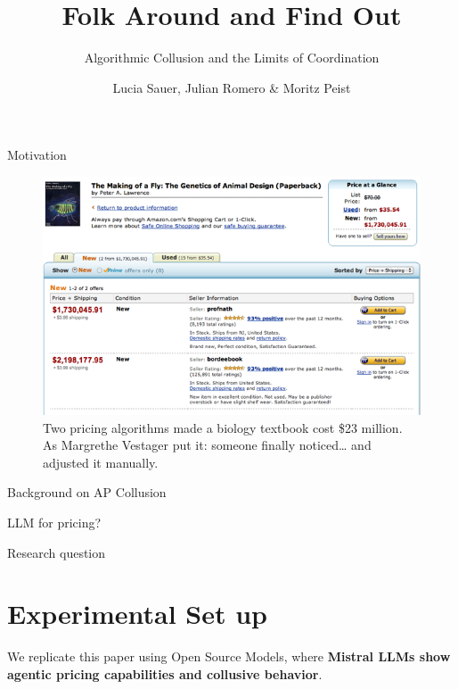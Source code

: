 \documentclass[10pt, aspectratio=169]{beamer}
\title{Folk Around and Find Out}
\subtitle{Algorithmic Collusion and the Limits of Coordination}
\date{}
\author{Lucia Sauer, Julian Romero \& Moritz Peist }
\institute{Barcelona School of Economics}
\begin{document}
\maketitle

\begin{frame}{Motivation}
\begin{figure}
        \centering
        \includegraphics[width=0.7\linewidth]{latex/slides_pricing_collusion/imgs/the_making_of_a_fly.png}
        \caption{Two pricing algorithms made a biology textbook cost \$23 million. As Margrethe Vestager put it: someone finally noticed… and adjusted it manually.}
        \label{fig:rep_org}
    \end{figure}  
\end{frame}


\begin{frame}{Background on AP Collusion}

    
\end{frame}


\begin{frame}{LLM for pricing?}

    
\end{frame}


\begin{frame}{Research question}

\end{frame}

\section{Experimental Set up}

\begin{frame}[fragile]{}
We replicate this paper using Open Source Models, where \textbf{Mistral LLMs show agentic pricing capabilities and collusive behavior}.


\end{frame}


\subsection{}
\end{document}
